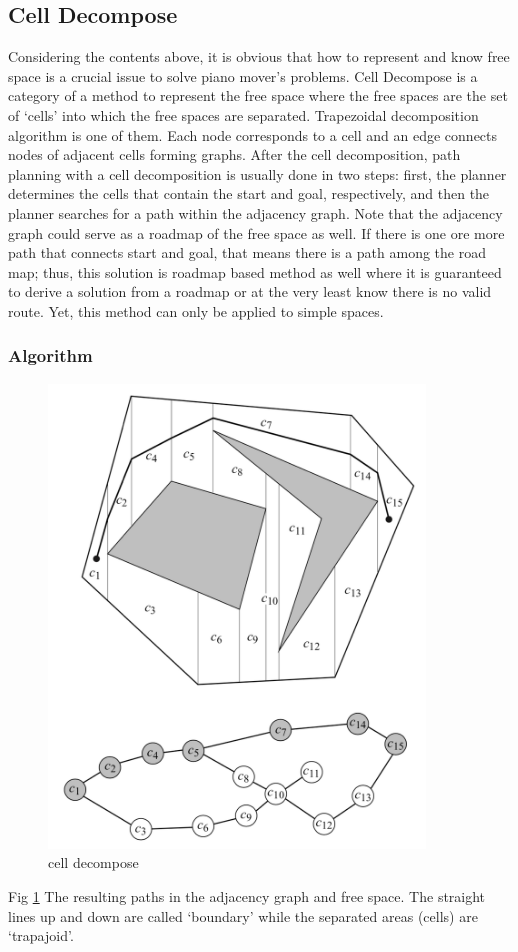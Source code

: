 \documentclass[11pt]{article}
\begin{document}
\subsection{Cell Decompose}
Considering the contents above, it is obvious that how to represent and know free space is a crucial issue to solve piano mover’s problems. Cell Decompose is a category of a method to represent the free space where the free spaces are the set of ‘cells’ into which the free spaces are separated. Trapezoidal decomposition algorithm is one of them. Each node corresponds to a cell and an edge connects nodes of adjacent cells forming graphs. After the cell decomposition, path planning with a cell decomposition is usually done in two steps: first, the planner determines the cells that contain the start and goal, respectively, and then the planner searches for a path within the adjacency graph. Note that the adjacency graph could serve as a roadmap of the free space as well. If there is one ore more path that connects start and goal, that means there is a path among the road map; thus, this solution is roadmap based method as well where it is guaranteed to derive a solution from a roadmap or at the very least know there is no valid route. Yet, this method can only be applied to simple spaces.
\subsubsection{Algorithm}
\begin{figure}[h]
  \centering
  \includegraphics[width=10cm]{cell_decompose.png}
  \caption{cell decompose}
  \label{fig:cell_decompose}
\end{figure}
Fig \ref{fig:cell_decompose} The resulting paths in the adjacency graph and free space. The straight lines up and down are called ‘boundary’ while the separated areas (cells) are ‘trapajoid’.
\end{document}
